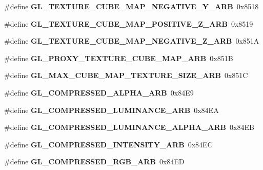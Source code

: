 \begin{DoxyCompactItemize}
\item 
\#define {\bfseries G\+L\+\_\+\+T\+E\+X\+T\+U\+R\+E\+\_\+\+C\+U\+B\+E\+\_\+\+M\+A\+P\+\_\+\+N\+E\+G\+A\+T\+I\+V\+E\+\_\+\+Y\+\_\+\+A\+R\+B}~0x8518\label{_s_d_l__opengl_8h_a60e8313711816e9c58e1110f4228f065}

\item 
\#define {\bfseries G\+L\+\_\+\+T\+E\+X\+T\+U\+R\+E\+\_\+\+C\+U\+B\+E\+\_\+\+M\+A\+P\+\_\+\+P\+O\+S\+I\+T\+I\+V\+E\+\_\+\+Z\+\_\+\+A\+R\+B}~0x8519\label{_s_d_l__opengl_8h_a756d409a09859664cd9276a7fd7eb628}

\item 
\#define {\bfseries G\+L\+\_\+\+T\+E\+X\+T\+U\+R\+E\+\_\+\+C\+U\+B\+E\+\_\+\+M\+A\+P\+\_\+\+N\+E\+G\+A\+T\+I\+V\+E\+\_\+\+Z\+\_\+\+A\+R\+B}~0x851\+A\label{_s_d_l__opengl_8h_a0f227ccd59d9649e1c2b51478ed296fc}

\item 
\#define {\bfseries G\+L\+\_\+\+P\+R\+O\+X\+Y\+\_\+\+T\+E\+X\+T\+U\+R\+E\+\_\+\+C\+U\+B\+E\+\_\+\+M\+A\+P\+\_\+\+A\+R\+B}~0x851\+B\label{_s_d_l__opengl_8h_ace2cdd0728b7d0385270b8e39fbc92ec}

\item 
\#define {\bfseries G\+L\+\_\+\+M\+A\+X\+\_\+\+C\+U\+B\+E\+\_\+\+M\+A\+P\+\_\+\+T\+E\+X\+T\+U\+R\+E\+\_\+\+S\+I\+Z\+E\+\_\+\+A\+R\+B}~0x851\+C\label{_s_d_l__opengl_8h_aeec2093a9470d87086ac25aaeb5c8b91}

\item 
\#define {\bfseries G\+L\+\_\+\+C\+O\+M\+P\+R\+E\+S\+S\+E\+D\+\_\+\+A\+L\+P\+H\+A\+\_\+\+A\+R\+B}~0x84\+E9\label{_s_d_l__opengl_8h_a5aa819cf8c5d8f10d395fbf20b9ad6ff}

\item 
\#define {\bfseries G\+L\+\_\+\+C\+O\+M\+P\+R\+E\+S\+S\+E\+D\+\_\+\+L\+U\+M\+I\+N\+A\+N\+C\+E\+\_\+\+A\+R\+B}~0x84\+E\+A\label{_s_d_l__opengl_8h_a70ee883c02540c3f82e6c2c0f88a6e98}

\item 
\#define {\bfseries G\+L\+\_\+\+C\+O\+M\+P\+R\+E\+S\+S\+E\+D\+\_\+\+L\+U\+M\+I\+N\+A\+N\+C\+E\+\_\+\+A\+L\+P\+H\+A\+\_\+\+A\+R\+B}~0x84\+E\+B\label{_s_d_l__opengl_8h_a64aae08d8243ef671bf2a19afc9cc5a4}

\item 
\#define {\bfseries G\+L\+\_\+\+C\+O\+M\+P\+R\+E\+S\+S\+E\+D\+\_\+\+I\+N\+T\+E\+N\+S\+I\+T\+Y\+\_\+\+A\+R\+B}~0x84\+E\+C\label{_s_d_l__opengl_8h_a2e0d1a6db7da0abc561463f125e397bb}

\item 
\#define {\bfseries G\+L\+\_\+\+C\+O\+M\+P\+R\+E\+S\+S\+E\+D\+\_\+\+R\+G\+B\+\_\+\+A\+R\+B}~0x84\+E\+D\label{_s_d_l__opengl_8h_a94ca346f3a187ec925bea865cd9ca78b}


\end{DoxyCompactItemize}
